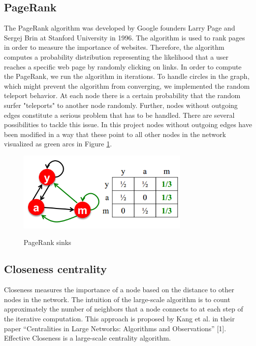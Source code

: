 \subsection{PageRank}
The PageRank algorithm was developed by Google founders Larry Page and Sergej Brin at Stanford University in 1996. The algorithm is used to rank pages in order to measure the importance of websites. Therefore, the algorithm computes a probability distribution representing the likelihood that a user reaches a specific web page by randomly clicking on links. In order to compute the PageRank, we run the algorithm in iterations. To handle circles in the graph, which might prevent the algorithm from converging, we implemented the random teleport behavior. At each node there is a certain probability that the random surfer "teleports" to another node randomly. Further, nodes without outgoing edges constitute a serious problem that has to be handled. There are several possibilities to tackle this issue. In this project nodes without outgoing edges have been modified in a way that these point to all other nodes in the network visualized as green arcs in Figure \ref{fig2}.

\begin{figure}[H]
	\begin{center}
		\label{fig2}		
		\includegraphics[width=0.75\textwidth]{fig2}	
		\caption{PageRank sinks}	
	\end{center}
\end{figure}

\subsection{Closeness centrality}
Closeness measures the importance of a node based on the distance to other nodes in the network. The intuition of the large-scale algorithm is to count approximately the number of neighbors that a node connects to at each step of the iterative computation. This approach is proposed by Kang et al. in their paper “Centralities in Large Networks: Algorithms and Observations” [1]. Effective Closeness is a large-scale centrality algorithm. 

